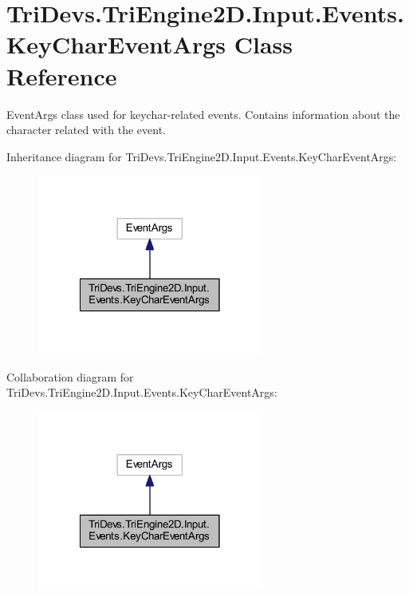 \hypertarget{class_tri_devs_1_1_tri_engine2_d_1_1_input_1_1_events_1_1_key_char_event_args}{\section{Tri\-Devs.\-Tri\-Engine2\-D.\-Input.\-Events.\-Key\-Char\-Event\-Args Class Reference}
\label{class_tri_devs_1_1_tri_engine2_d_1_1_input_1_1_events_1_1_key_char_event_args}
}


Event\-Args class used for keychar-\/related events. Contains information about the character related with the event.  




Inheritance diagram for Tri\-Devs.\-Tri\-Engine2\-D.\-Input.\-Events.\-Key\-Char\-Event\-Args\-:
\nopagebreak
\begin{figure}[H]
\begin{center}
\leavevmode
\includegraphics[width=210pt]{class_tri_devs_1_1_tri_engine2_d_1_1_input_1_1_events_1_1_key_char_event_args__inherit__graph}
\end{center}
\end{figure}


Collaboration diagram for Tri\-Devs.\-Tri\-Engine2\-D.\-Input.\-Events.\-Key\-Char\-Event\-Args\-:
\nopagebreak
\begin{figure}[H]
\begin{center}
\leavevmode
\includegraphics[width=210pt]{class_tri_devs_1_1_tri_engine2_d_1_1_input_1_1_events_1_1_key_char_event_args__coll__graph}
\end{center}
\end{figure}
